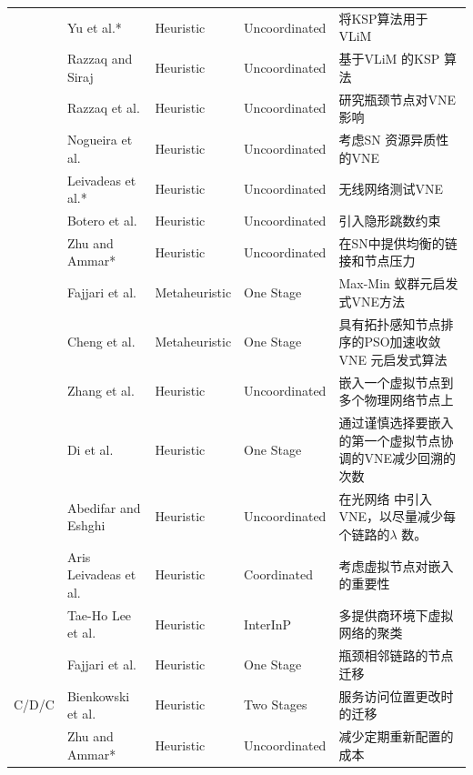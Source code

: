 \begin{longtable}[h]{@{}lm{}m{}m{}m{}}
 & Yu et al.*  \cite{yu2008rethinking}  & Heuristic & Uncoordinated & 将KSP算法\cite{eppstein1998finding}用于VLiM\\
 & Razzaq and Siraj  \cite{razzaq2010approach}  & Heuristic & Uncoordinated & 基于VLiM 的KSP 算法\\
 & Razzaq et al.  \cite{razzaq2011minimizing}  & Heuristic & Uncoordinated & 研究瓶颈节点对VNE影响\\
 & Nogueira et al.  \cite{nogueira2011virtual}  & Heuristic & Uncoordinated &  考虑SN 资源异质性的VNE\\
 & Leivadeas et al.*  \cite{leivadeas2011architecture}  & Heuristic & Uncoordinated & 无线网络测试VNE\\
 & Botero et al. \cite{botero2012optimal,botero2011flexible}  & Heuristic & Uncoordinated & 引入隐形跳数约束\\
 & Zhu and Ammar*  \cite{zhu2006algorithms}  & Heuristic & Uncoordinated & 在SN中提供均衡的链接和节点压力\\
 & Fajjari et al.  \cite{fajjari2011vne}  & Metaheuristic & One Stage & Max-Min 蚁群元启发式VNE方法\\
 & Cheng et al.  \cite{cheng2012virtual}  & Metaheuristic & One Stage & 具有拓扑感知节点排序\cite{cheng2011virtual}的PSO加速收敛VNE 元启发式算法\\
 & Zhang et al.  \cite{zhang2012virtual}  & Heuristic & Uncoordinated & 嵌入一个虚拟节点到多个物理网络节点上
\\
 & Di et al.  \cite{di2012efficient}  & Heuristic & One Stage & 通过谨慎选择要嵌入的第一个虚拟节点协调的VNE减少回溯的次数\\
 & Abedifar and Eshghi  \cite{abedifar2012novel}  & Heuristic & Uncoordinated & 在光网络 中引入VNE，以尽量减少每个链路的$\lambda$ 数。\\
 & Aris Leivadeas et al.  \cite{leivadeas2012socio}  & Heuristic & Coordinated & 考虑虚拟节点对嵌入的重要性\\
 & Tae-Ho Lee et al.  \cite{lee2012graph}  & Heuristic & InterInP & 多提供商环境下虚拟网络的聚类\\
\hline
\multirow{7}{*}{C/D/C} & Fajjari et al.  \cite{fajjari2011vnr}  & Heuristic & One Stage & 瓶颈相邻链路的节点迁移\\
 & Bienkowski et al.  \cite{bienkowski2010competitive,bienkowski2014wide}  & Heuristic & Two Stages & 服务访问位置更改时的迁移\\
 & Zhu and Ammar*  \cite{zhu2006algorithms}  & Heuristic & Uncoordinated & 减少定期重新配置的成本\\

\end{longtable}
